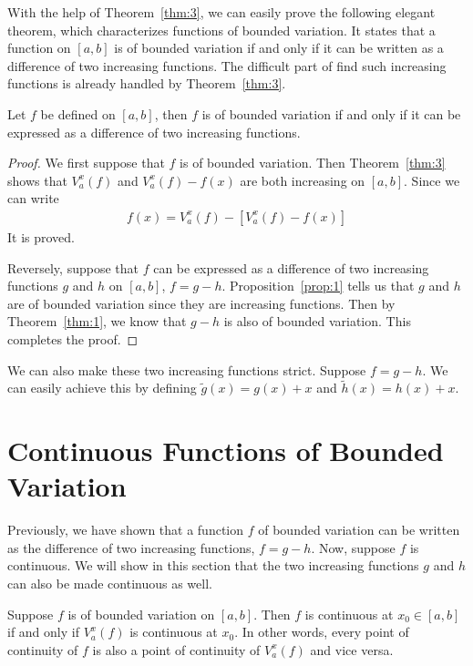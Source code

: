 \documentclass[thmcnt=section, color=blue, 12pt]{my-elegantbook}
\begin{document}
With the help of Theorem~\ref{thm:3}, we can easily prove
the following elegant theorem,
which characterizes functions of bounded variation.
It states that a function on $[a, b]$ is of bounded variation
if and only if it can be written as a difference of two increasing functions.
The difficult part of find such increasing functions
is already handled by Theorem~\ref{thm:3}.

\begin{theorem} \label{thm:4}
	Let $f$ be defined on $[a, b]$,
	then $f$ is of bounded variation if and only if
	it can be expressed as a difference of two
	increasing functions.
\end{theorem}

\begin{proof}
	We first suppose that $f$ is of bounded variation.
	Then Theorem~\ref{thm:3} shows that $V_a^x(f)$
	and $V_a^x(f) - f(x)$ are both increasing on $[a, b]$.
	Since we can write
	\begin{align*}
		f(x) = V_a^x(f) - [ V_a^x (f) - f(x)]
	\end{align*}
	It is proved.

	Reversely, suppose that $f$ can be expressed as a difference of
	two increasing functions $g$ and $h$ on $[a, b]$, $f = g - h$.
	Proposition~\ref{prop:1} tells us that $g$ and $h$ are of bounded variation
	since they are increasing functions.
	Then by Theorem~\ref{thm:1}, we know that $g - h$ is also of bounded variation.
	This completes the proof.
\end{proof}

\begin{note}
	We can also make these two increasing functions strict.
	Suppose $f = g - h$.
	We can easily achieve this by defining $\tilde{g}(x) = g(x) + x$
	and $\tilde{h}(x) = h(x) + x$.
\end{note}

\section{Continuous Functions of Bounded Variation}

Previously, we have shown that a function $f$ of bounded variation can be
written as the difference of two increasing functions, $f = g - h$.
Now, suppose $f$ is continuous.
We will show in this section that the two increasing functions $g$ and $h$
can also be made continuous as well.

\begin{theorem} \label{thm:24}
	Suppose $f$ is of bounded variation on $[a, b]$.
	Then $f$ is continuous at $x_0 \in [a, b]$
	if and only if $V_a^x(f)$ is continuous at $x_0$.
	In other words, every point of continuity of $f$ is also
	a point of continuity of $V_a^x(f)$ and vice versa.
\end{theorem}
\end{document}

